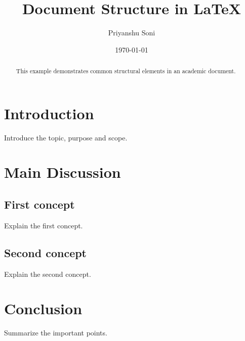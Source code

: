 \documentclass[12pt,a4paper]{article}
\title{Document Structure in LaTeX}
\author{Priyanshu Soni}
\date{\today}
\begin{document}
\maketitle
\begin{abstract}
This example demonstrates common structural elements in an academic document.
\end{abstract}

\tableofcontents
\newpage

\section{Introduction}
Introduce the topic, purpose and scope.

\section{Main Discussion}
\subsection{First concept}
Explain the first concept.
\subsection{Second concept}
Explain the second concept.

\section{Conclusion}
Summarize the important points.
\end{document}
